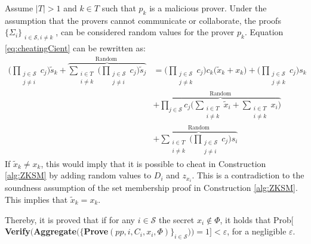 Assume $|T|>1$ and $k\in T$ such that  $p_k$ is a malicious prover. Under the assumption that the provers cannot communicate or collaborate, the proofs $\{\Sigma_i\}_{\substack{i\in\mathcal{S}, i\neq k}}$, can be considered random values for the  prover $p_k$. Equation \eqref{eq:cheatingCient} can be rewritten as:
\begin{align*}
\big(\prod_{\substack{j\in\mathcal{S}\\ j\neq i}} c_j \big) \tilde{s}_k +  \overbrace{\sum_{\substack{i\in T \\ i\neq k}} \big(\prod_{\substack{j\in\mathcal{S}\\ j\neq i}} c_j \big) \tilde{s}_j}^{\text{Random }}  &=
  \big ( \prod_{\substack{j\in\mathcal{S}\\ j\neq k}} c_j \big)c_k \big( \tilde{x}_k + x_k\big) +\big( \prod_{\substack{j\in\mathcal{S}\\ j\neq k}} c_j\big) s_k 
  \\ 
   &+ \overbrace{\prod_{j\in\mathcal{S}} c_j \big(\sum_{\substack{i\in T \\ i\neq k}} \tilde{x}_i + \sum_{\substack{i\in T \\ i\neq k}} x_i\big)}^{\text{Random}} \\
   & + \overbrace{\sum_{\substack{i\in T \\ i\neq k}} \big( \prod_{\substack{j\in\mathcal{S}\\ j\neq i}} c_j\big) s_i  }^{\text{Random}}
\end{align*}
If $\tilde{x}_k \neq x_k$, this would imply that it is possible to cheat in Construction \ref{alg:ZKSM} by adding random values to $D_i$ and $z_{x_i}$. This is a contradiction to the soundness assumption of the set membership proof in Construction \ref{alg:ZKSM}. This implies that $\tilde{x}_k=x_k$. 

Thereby, it is proved that if for any $i\in\mathcal{S}$ the secret  $x_i\notin \Phi$, it holds that Prob$[ $\textbf{Verify}$($\textbf{Aggregate}$(\{$\textbf{Prove}$(pp,i,C_i,x_i,\Phi)\}_{i\in\mathcal{S}}) ) = 1] < \varepsilon$, for a negligible $\varepsilon$.


